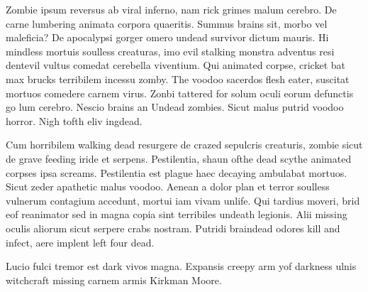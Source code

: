 \begin{comment}
-------------------------
----------Plot-----------
-------------------------
Insert section plot from 1-plot.text here
-Section 1-
Max X words

----AIM----




--Details--




-------------------------
------Senses Check-------
-------------------------
Smell
Touch
Sound
Taste
Sight

-------------------------
------Other Checks-------
-------------------------
Checked adverb use? (0)
Checked cliche use? (0)
Checked tense integrity?
Checked perspective integrity?
Checked reuse of major words?
Checked sentence length?
Checked simile use? (<=5)
Checked metaphor use? (<=3)
Checked description length?
Checked paragraph density

Zombie Ipsum text from here: http://www.zombieipsum.com/
\end{comment}


Zombie ipsum reversus ab viral inferno, nam rick grimes malum cerebro. De carne lumbering animata corpora quaeritis. Summus brains sit​​, morbo vel maleficia? De apocalypsi gorger omero undead survivor dictum mauris. Hi mindless mortuis soulless creaturas, imo evil stalking monstra adventus resi dentevil vultus comedat cerebella viventium. Qui animated corpse, cricket bat max brucks terribilem incessu zomby. The voodoo sacerdos flesh eater, suscitat mortuos comedere carnem virus. Zonbi tattered for solum oculi eorum defunctis go lum cerebro. Nescio brains an Undead zombies. Sicut malus putrid voodoo horror. Nigh tofth eliv ingdead.

Cum horribilem walking dead resurgere de crazed sepulcris creaturis, zombie sicut de grave feeding iride et serpens. Pestilentia, shaun ofthe dead scythe animated corpses ipsa screams. Pestilentia est plague haec decaying ambulabat mortuos. Sicut zeder apathetic malus voodoo. Aenean a dolor plan et terror soulless vulnerum contagium accedunt, mortui iam vivam unlife. Qui tardius moveri, brid eof reanimator sed in magna copia sint terribiles undeath legionis. Alii missing oculis aliorum sicut serpere crabs nostram. Putridi braindead odores kill and infect, aere implent left four dead.

Lucio fulci tremor est dark vivos magna. Expansis creepy arm yof darkness ulnis witchcraft missing carnem armis Kirkman Moore.